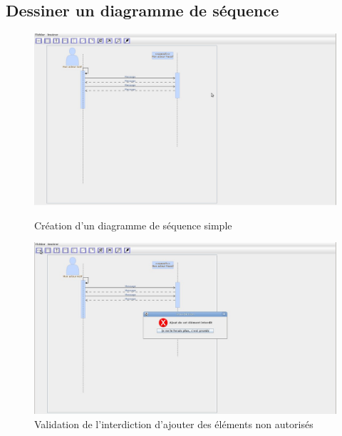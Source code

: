 \documentclass[12pt,a4paper,openany]{report}
\begin{document}
		\subsection{Dessiner un diagramme de séquence}
		\begin{figure}[H]
			\centering
			\includegraphics[width=18cm]{validation5.jpg}\\ \vspace{25px} 
			\caption{Création d'un diagramme de séquence simple}
			\includegraphics[width=18cm]{validation6.jpg}
			\caption{Validation de l'interdiction d'ajouter des éléments non autorisés}
		\end{figure}
		\newpage
\end{document}

